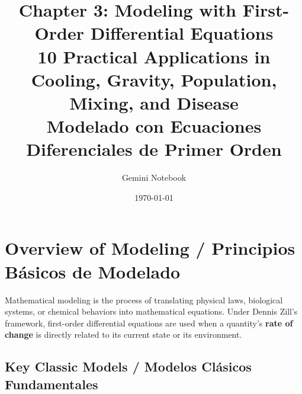 \documentclass[11pt,letterpaper]{article}
\title{\textbf{Chapter 3: Modeling with First-Order Differential Equations}\\
\large 10 Practical Applications in Cooling, Gravity, Population, Mixing, and Disease\\
\normalsize Modelado con Ecuaciones Diferenciales de Primer Orden}
\author{Gemini Notebook}
\date{\today}
\begin{document}
\maketitle

\section{Overview of Modeling / Principios Básicos de Modelado}

Mathematical modeling is the process of translating physical laws, biological systems, or chemical behaviors into mathematical equations. Under Dennis Zill's framework, first-order differential equations are used when a quantity's \textbf{rate of change} is directly related to its current state or its environment.

\subsection{Key Classic Models / Modelos Clásicos Fundamentales}
\end{document}
